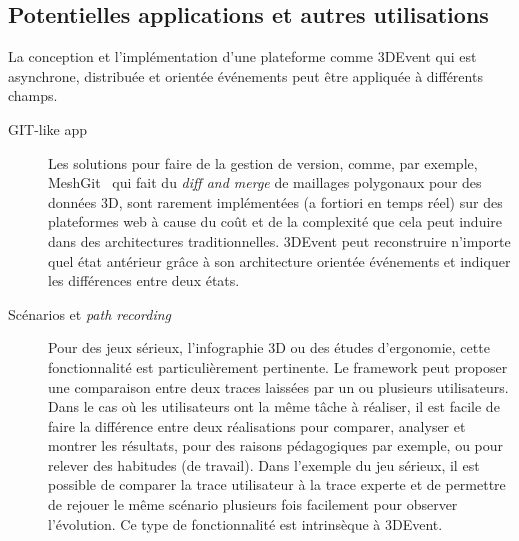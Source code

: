 \subsection{Potentielles applications et autres utilisations}
La conception et l'implémentation d'une plateforme comme 3DEvent qui est 
asynchrone, distribuée et orientée événements peut 
être appliquée à différents champs.
\begin{description}
	\item[GIT-like app] Les solutions pour faire de la gestion de version, comme, 
	par exemple,
 	MeshGit~\cite{Denning2013} qui fait du
	\textit{diff and merge} de maillages polygonaux pour des données \gls{3D}, 
	sont rarement implémentées (a fortiori en 
	temps réel) sur des plateformes web à cause du coût et de la complexité que 
	cela peut induire dans des architectures traditionnelles. 3DEvent peut 
	reconstruire n'importe quel état antérieur grâce à son architecture orientée 
	événements et indiquer les différences entre deux états.%
	
	\item[Scénarios et \textit{path recording}] Pour des jeux sérieux, l'infographie 
	3D ou des études d'ergonomie, cette fonctionnalité est particulièrement 
	pertinente. Le \gls{framework} peut proposer une comparaison entre deux traces 
	laissées par un ou plusieurs utilisateurs. Dans le cas où les utilisateurs ont la 
	même tâche à réaliser, il est facile de faire la différence entre deux réalisations 
	pour comparer, analyser et montrer les résultats, pour des raisons 
	pédagogiques par exemple, ou pour relever des habitudes (de travail). Dans 
	l'exemple du jeu sérieux, il est possible de comparer la trace utilisateur à la trace experte 
	et de permettre de rejouer le même scénario plusieurs fois facilement pour 
	observer l'évolution. Ce type de fonctionnalité est intrinsèque à 3DEvent. 
	

\end{description}
